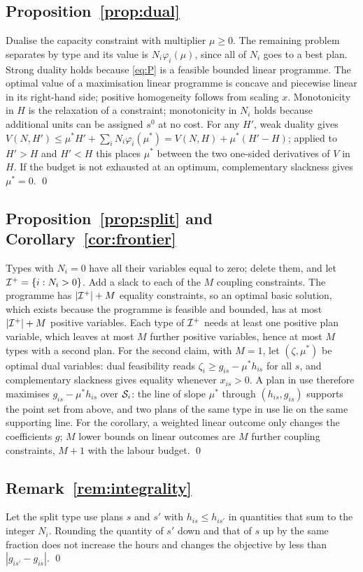 \subsection*{Proposition~\ref{prop:dual}}
Dualise the capacity constraint with multiplier $\mu\ge0$. The remaining problem separates by type and its value is
$N_i\varphi_i(\mu)$, since all of $N_i$ goes to a best plan. Strong duality holds because \eqref{eq:P} is a
feasible bounded linear programme. The optimal value of a maximisation linear programme is concave and piecewise
linear in its right-hand side; positive homogeneity follows from scaling $x$. Monotonicity in $H$ is the
relaxation of a constraint; monotonicity in $N_i$ holds because additional units can be assigned $s^0$ at no cost.
For any $H'$, weak duality gives
$V(N,H')\le\mu^\ast H'+\sum_iN_i\varphi_i(\mu^\ast)=V(N,H)+\mu^\ast(H'-H)$; applied to $H'>H$ and $H'<H$ this
places $\mu^\ast$ between the two one-sided derivatives of $V$ in $H$. If the budget is not exhausted at an
optimum, complementary slackness gives $\mu^\ast=0$. \qed

\subsection*{Proposition~\ref{prop:split} and Corollary~\ref{cor:frontier}}
Types with $N_i=0$ have all their variables equal to zero; delete them, and let $\mathcal{I}^+=\{i:N_i>0\}$. Add a slack to
each of the $M$ coupling constraints. The programme has $|\mathcal{I}^+|+M$ equality constraints, so an optimal basic
solution, which exists because the programme is feasible and bounded, has at most $|\mathcal{I}^+|+M$ positive variables.
Each type of $\mathcal{I}^+$ needs at least one positive plan variable, which leaves at most $M$ further positive
variables, hence at most $M$ types with a second plan. For the second claim, with $M=1$, let $(\zeta,\mu^\ast)$ be
optimal dual variables: dual feasibility reads $\zeta_i\ge g_{is}-\mu^\ast h_{is}$ for all $s$, and complementary
slackness gives equality whenever $x_{is}>0$. A plan in use therefore maximises $g_{is}-\mu^\ast h_{is}$ over
$\mathcal{S}_i$: the line of slope $\mu^\ast$ through $(h_{is},g_{is})$ supports the point set from above, and two plans of
the same type in use lie on the same supporting line. For the corollary, a weighted linear outcome only changes
the coefficients $g$; $M$ lower bounds on linear outcomes are $M$ further coupling constraints, $M+1$ with the
labour budget. \qed

\subsection*{Remark~\ref{rem:integrality}}
Let the split type use plans $s$ and $s'$ with $h_{is}\le h_{is'}$ in quantities that sum to the integer $N_i$.
Rounding the quantity of $s'$ down and that of $s$ up by the same fraction does not increase the hours and changes
the objective by less than $|g_{is'}-g_{is}|$. \qed

